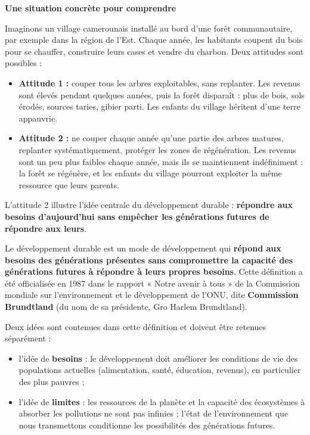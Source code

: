 \documentclass[11pt]{article}
\newcommand{\cle}[1]{{\popxbold\color{popdark}#1}}
\newcounter{popsec}
\newcounter{popsub}
\newcommand{\courssub}[1]{%
  \stepcounter{popsub}%
  \par\vspace{9pt}\noindent{\popxbold\fontsize{11.5}{13}\selectfont\color{popink}{\color{poporange}\thepopsec.\thepopsub}\hspace{6pt}#1}\par\nopagebreak\vspace{4pt}
}
\begin{document}
\courssub{La notion de développement durable}

\textbf{Une situation concrète pour comprendre}\par

Imaginons un village camerounais installé au bord d'une forêt communautaire, par exemple dans la région de l'Est. Chaque année, les habitants coupent du bois pour se chauffer, construire leurs cases et vendre du charbon. Deux attitudes sont possibles :

\begin{itemize}
\item \textbf{Attitude 1 :} couper tous les arbres exploitables, sans replanter. Les revenus sont élevés pendant quelques années, puis la forêt disparaît : plus de bois, sols érodés, sources taries, gibier parti. Les enfants du village héritent d'une terre appauvrie.
\item \textbf{Attitude 2 :} ne couper chaque année qu'une partie des arbres matures, replanter systématiquement, protéger les zones de régénération. Les revenus sont un peu plus faibles chaque année, mais ils se maintiennent indéfiniment : la forêt se régénère, et les enfants du village pourront exploiter la même ressource que leurs parents.
\end{itemize}

L'attitude 2 illustre l'idée centrale du développement durable : \textbf{répondre aux besoins d'aujourd'hui sans empêcher les générations futures de répondre aux leurs}.

\begin{definition}
Le \cle{développement durable} est un mode de développement qui \textbf{répond aux besoins des générations présentes sans compromettre la capacité des générations futures à répondre à leurs propres besoins}. Cette définition a été officialisée en 1987 dans le rapport « Notre avenir à tous » de la Commission mondiale sur l'environnement et le développement de l'ONU, dite \textbf{Commission Brundtland} (du nom de sa présidente, Gro Harlem Brundtland).
\end{definition}

Deux idées sont contenues dans cette définition et doivent être retenues séparément :

\begin{itemize}
\item l'idée de \textbf{besoins} : le développement doit améliorer les conditions de vie des populations actuelles (alimentation, santé, éducation, revenus), en particulier des plus pauvres ;
\item l'idée de \textbf{limites} : les ressources de la planète et la capacité des écosystèmes à absorber les pollutions ne sont pas infinies ; l'état de l'environnement que nous transmettons conditionne les possibilités des générations futures.
\end{itemize}
\end{document}
